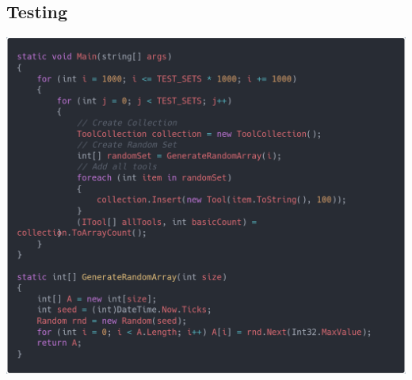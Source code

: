 \documentclass[10pt,a4paper]{report}
\begin{document}
\subsection{Testing}
\includegraphics[width=\textwidth]{testing.png} 
\end{document}
